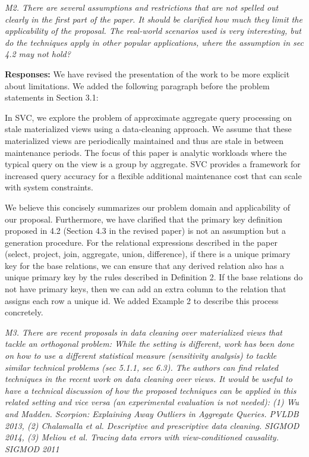 \vspace{1em}
\emph{M2. There are several assumptions and restrictions that are not spelled out clearly in the first part of the paper. It should be clarified how much they limit the applicability of the proposal. The real-world scenarios used is very interesting, but do the techniques apply in other popular applications, where the assumption in sec 4.2 may not hold?}

\vspace{.25em}

{\bf Responses:} We have revised the presentation of the work to be more explicit about limitations. We added the following paragraph before the problem statements in Section 3.1:
\begin{displayquote}In SVC, we explore the problem of approximate aggregate query
processing on stale materialized views using a data-cleaning approach.
We assume that these materialized views are periodically
maintained and thus are stale in between maintenance periods. The
focus of this paper is analytic workloads where the typical query on the view is a group by aggregate. SVC provides a framework for increased
query accuracy for a flexible additional  maintenance cost that can
scale with system constraints.\end{displayquote}

We believe this concisely summarizes our problem domain and applicability of our proposal. 
Furthermore, we have clarified that the primary key definition proposed in 4.2 
(Section 4.3 in the revised paper) is not an assumption but a generation procedure. For the relational expressions described in the paper (select, project, join, aggregate, union, difference), if there is a unique primary key for the base relations, we can ensure that any derived relation also has a unique primary key by the rules described in Definition 2. If the base relations do not have primary keys, then we can add an extra column to the relation that assigns each row a unique id. We added Example 2 to describe this process concretely.

\vspace{1em}
\emph{M3. There are recent proposals in data cleaning over materialized views that tackle an orthogonal problem: While the setting is different, work has been done on how to use a different statistical measure (sensitivity analysis) to tackle similar technical problems (sec 5.1.1, sec 6.3). The authors can find related techniques in the recent work on data cleaning over views. It would be useful to have a technical discussion of how the proposed techniques can be applied in this related setting and vice versa (an experimental evaluation is not needed): (1) Wu and Madden. Scorpion: Explaining Away Outliers in Aggregate Queries. PVLDB 2013, (2) Chalamalla et al. Descriptive and prescriptive data cleaning. SIGMOD 2014, (3) Meliou et al. Tracing data errors with view-conditioned causality. SIGMOD 2011}

